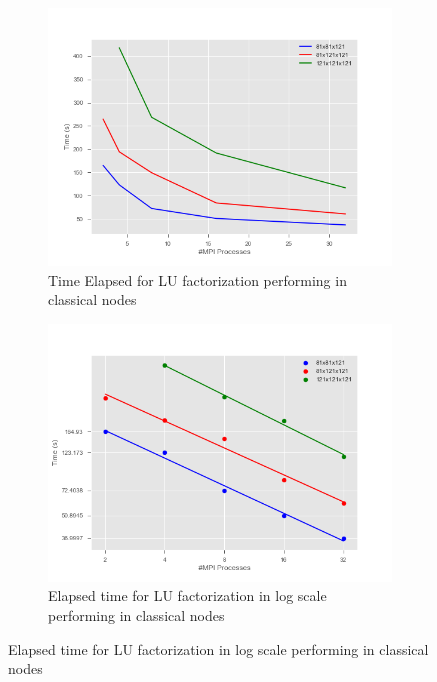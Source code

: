 \begin{figure}[!h]
\centering 
  \begin{subfigure}[b]{0.7\textwidth}
    \includegraphics[width=\textwidth]{images/TimeLU.png}
    \caption{Time Elapsed for LU factorization performing in classical nodes}
    \label{TimeLU}
  \end{subfigure}   
  \begin{subfigure}[b]{0.7\textwidth}
    \includegraphics[width=\textwidth]{images/TimeMPIlog.png}
    \caption{Elapsed time for LU factorization in log scale performing in classical nodes}
    \label{TimeMPIlog}
  \end{subfigure}  
\end{figure}
